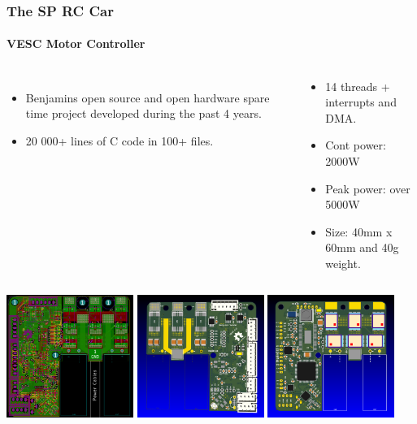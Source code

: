 \documentclass[aspectratio=169,electronics,notopline]{beamer}
\begin{document}
\begin{frame}
\frametitle{The SP RC Car}
\framesubtitle{VESC Motor Controller}
\begin{columns}
\begin{itemize}
\item Benjamins open source and open hardware spare time project developed during the past 4 years.
\item 20 000+ lines of C code in 100+ files.
\end{itemize}
\begin{center}
\begin{itemize}
\item 14 threads + interrupts and DMA.
\item Cont power: 2000W
\item Peak power: over 5000W
\item Size: 40mm x 60mm and 40g weight.
\end{itemize}
\end{center}
\end{columns}
\begin{center}
\vspace{-3mm}
\includegraphics[height=40mm]{Figures/VESC_6.png} \hspace{5mm}
\includegraphics[height=40mm]{Figures/VESC_6_F.png} \hspace{5mm}
\includegraphics[height=40mm]{Figures/VESC_6_B.png}
\end{center}
\end{frame}
\end{document}
